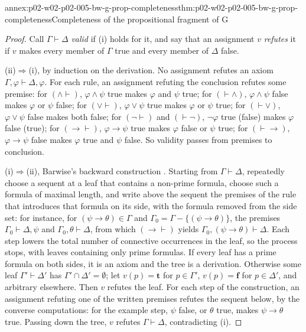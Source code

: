\begin{annexitem}{annex:p02-w02-p02-005-bw-g-prop-completeness}{thm:p02-w02-p02-005-bw-g-prop-completeness}{Completeness of the propositional fragment of G}
\begin{proof}
Call \(\Gamma\vdash\Delta\) \emph{valid} if (i) holds for it, and say that
an assignment \(v\) \emph{refutes} it if \(v\) makes every member of
\(\Gamma\) true and every member of \(\Delta\) false.

(ii)\(\Rightarrow\)(i), by induction on the derivation.  No assignment
refutes an axiom \(\Gamma,\varphi\vdash\Delta,\varphi\).  For each rule, an
assignment refuting the conclusion refutes some premise: for
\((\land\vdash)\), \(\varphi\land\psi\) true makes \(\varphi\) and \(\psi\)
true; for \((\vdash\land)\), \(\varphi\land\psi\) false makes \(\varphi\)
or \(\psi\) false; for \((\lor\vdash)\), \(\varphi\lor\psi\) true makes
\(\varphi\) or \(\psi\) true; for \((\vdash\lor)\), \(\varphi\lor\psi\)
false makes both false; for \((\neg\vdash)\) and \((\vdash\neg)\),
\(\neg\varphi\) true (false) makes \(\varphi\) false (true); for
\((\to\vdash)\), \(\varphi\to\psi\) true makes \(\varphi\) false or
\(\psi\) true; for \((\vdash\to)\), \(\varphi\to\psi\) false makes
\(\varphi\) true and \(\psi\) false.  So validity passes from premises to
conclusion.

(i)\(\Rightarrow\)(ii), Barwise's backward construction
\cite[ch.~A.1, \S4, p.~38]{Barwise1977FirstOrder}.  Starting from
\(\Gamma\vdash\Delta\), repeatedly choose a sequent at a leaf that contains
a non-prime formula, choose such a formula of maximal length, and write
above the sequent the premises of the rule that introduces that formula on
its side, with the formula removed from the side set: for instance, for
\((\psi\to\theta)\in\Gamma\) and \(\Gamma_0=\Gamma-\{(\psi\to\theta)\}\),
the premises \(\Gamma_0\vdash\Delta,\psi\) and \(\Gamma_0,\theta\vdash\Delta\),
from which \((\to\vdash)\) yields \(\Gamma_0,(\psi\to\theta)\vdash\Delta\).
Each step lowers the total number of connective occurrences in the leaf, so
the process stops, with leaves containing only prime formulas.  If every
leaf has a prime formula on both sides, it is an axiom and the tree is a
derivation.  Otherwise some leaf \(\Gamma'\vdash\Delta'\) has
\(\Gamma'\cap\Delta'=\emptyset\); let \(v(p)=\mathbf t\) for
\(p\in\Gamma'\), \(v(p)=\mathbf f\) for \(p\in\Delta'\), and arbitrary
elsewhere.  Then \(v\) refutes the leaf.  For each step of the
construction, an assignment refuting one of the written premises refutes
the sequent below, by the converse computations: for the example step,
\(\psi\) false, or \(\theta\) true, makes \(\psi\to\theta\) true.  Passing
down the tree, \(v\) refutes \(\Gamma\vdash\Delta\), contradicting (i).
\end{proof}
\end{annexitem}

